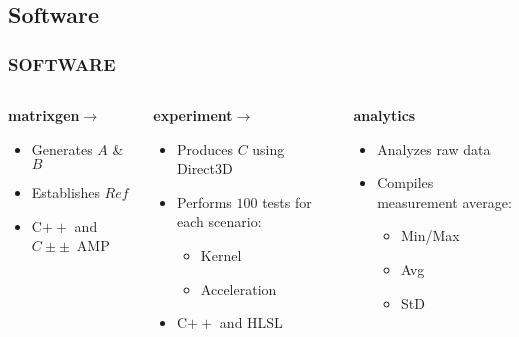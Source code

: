 \subsection{Software}
\begin{frame}
\frametitle{SOFTWARE}

\begin{columns}[T]
  \begin{column}{0.33\textwidth}
    \textbf{matrixgen}\hfill$\rightarrow$\hfill
    \begin{itemize}
    \item Generates $A$ \& $B$
    \item Establishes $Ref$
    \item C$++$ and $C±±$~AMP
    \end{itemize}
  \end{column}
  \begin{column}{0.33\textwidth}
    \textbf{experiment}\hfill$\rightarrow$\hfill
    \begin{itemize}
    \item Produces $C$ using Direct3D
    \item Performs $100$ tests for each scenario:
      \begin{itemize}
      \item Kernel
      \item Acceleration
      \end{itemize}
    \item C$++$ and HLSL
    \end{itemize}
  \end{column}
  \begin{column}{0.33\textwidth}
    \textbf{analytics}
    \begin{itemize}
    \item Analyzes raw data
    \item Compiles measurement average:
      \begin{itemize}
      \item Min/Max
      \item Avg
      \item StD
      \end{itemize}
    \end{itemize}
  \end{column}
\end{columns}

\end{frame}
